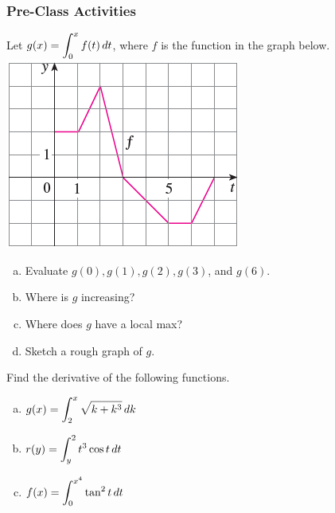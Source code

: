\documentclass[notes]{subfiles}
\begin{document}
	\subsubsection*{Pre-Class Activities}
		\begin{ex}
			Let $g(x) = \displaystyle \int_0^x f(t)\, dt$, where $f$ is the function in the graph below.\\
			\includegraphics{4.3fig1}\\
			\begin{enumerate}[(a)]
				\item Evaluate $g(0), g(1), g(2), g(3)$, and $g(6)$.
					
				\item Where is $g$ increasing?
					
				\item Where does $g$ have a local max?
					
				\item Sketch a rough graph of $g$.
					
			\end{enumerate}
		\end{ex}	
			\newpage
			
		\begin{ex}
			Find the derivative of the following functions.
			\begin{enumerate}[(a)]
				\item $g(x) = \displaystyle \int_2^x \sqrt{k + k^3}\, dk$
					\vs{1}
					
				\item $r(y) = \displaystyle \int_y^2 t^3\cos t\, dt$
					\vs{1}
					
				\item $f(x) = \displaystyle \int_0^{x^4} \tan^2t\, dt$
					\vs{1}
			\end{enumerate}
		\end{ex}
		
\end{document}
